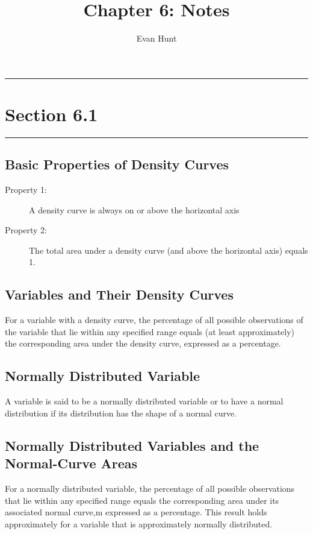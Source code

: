 \documentclass[12pt]{article}
\title{Chapter 6: Notes}
\author{Evan Hunt}
\begin{document}
    \maketitle

    \noindent\rule{\textwidth}{0.4pt}
    \section[]{Section 6.1}
    \noindent\rule{\textwidth}{0.4pt}
        \subsection*{Basic Properties of Density Curves}
            \begin{description}
                \item[Property 1:] A density curve is always on or above the horizontal axis
                \item[Property 2:] The total area under a density curve (and above the horizontal
                axis) equals 1.                
            \end{description}
        \subsection*{Variables and Their Density Curves}
            For a variable with a density curve, the percentage of all possible observations of
            the variable that lie within any specified range equals (at least approximately) the
            corresponding area under the density curve, expressed as a percentage.
        \subsection*{Normally Distributed Variable}
            A variable is said to be a normally distributed variable or to have a normal
            distribution if its distribution has the shape of a normal curve.
        \subsection*{Normally Distributed Variables and the Normal-Curve Areas}
            For a normally distributed variable, the percentage of all possible observations that
            lie within any specified range equals the corresponding area under its associated
            normal curve,m expressed as a percentage. This result holds approximately for a
            variable that is approximately normally distributed.
\end{document}
